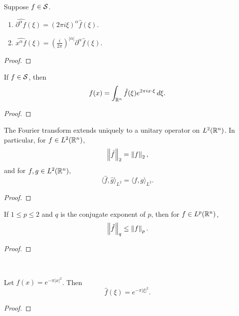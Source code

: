 \begin{proposition}\ \par
    Suppose $f\in \mathcal{S}$.
    \begin{enumerate}
        \item $\widehat{\partial^{\alpha}f}(\xi)=(2\pi i\xi)^{\alpha}\hat{f}(\xi)$.
        \item $\widehat{x^{\alpha}f}(\xi)=\left(\frac{i}{2\pi}\right)^{|\alpha|}\partial^{\alpha}\hat{f}(\xi)$.
    \end{enumerate}
\end{proposition}
\begin{proof}
    
\end{proof}

\begin{proposition}
    If $f\in \mathcal{S}$, then
    \[
    f(x)=\int_{\mathbb{R}^n}\hat{f}(\xi)e^{2\pi i x\cdot \xi}\,d\xi.
    \]
\end{proposition}
\begin{proof}
    
\end{proof}

\begin{theorem}
    The Fourier transform extends uniquely to a unitary operator on $L^2(\mathbb{R}^n)$. In particular, for $f\in L^2(\mathbb{R}^n)$,
    \[
    \left\lVert{\hat{f}}\right\rVert_2 = \left\lVert{f}\right\rVert_2,
    \]
    and for $f,g\in L^2(\mathbb{R}^n)$,
    \[
    \langle \hat{f},\hat{g}\rangle_{L^2}=\langle f,g\rangle_{L^2}.
    \]
\end{theorem}
\begin{proof}
    
\end{proof}

\begin{theorem}
    If $1\leq p\leq 2$ and $q$ is the conjugate exponent of $p$, then for $f\in L^p(\mathbb{R}^n)$,
    \[
    \left\lVert{\hat{f}}\right\rVert_q \leq \left\lVert{f}\right\rVert_p.
    \]
\end{theorem}
\begin{proof}
    
\end{proof}

\begin{proposition}\ \par
    Let $f(x)=e^{-\pi |x|^2}$. Then
    \[
    \hat{f}(\xi)=e^{-\pi |\xi|^2}.
    \]
\end{proposition}
\begin{proof}
    
\end{proof}

